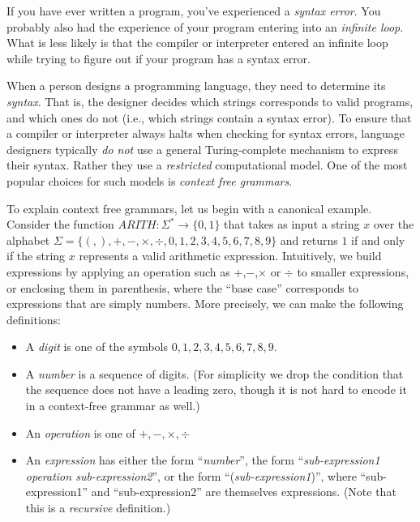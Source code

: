 If you have ever written a program, you've experienced a \emph{syntax
error}. You probably also had the experience of your program entering
into an \emph{infinite loop}. What is less likely is that the compiler
or interpreter entered an infinite loop while trying to figure out if
your program has a syntax error.

When a person designs a programming language, they need to determine its
\emph{syntax}. That is, the designer decides which strings corresponds
to valid programs, and which ones do not (i.e., which strings contain a
syntax error). To ensure that a compiler or interpreter always halts
when checking for syntax errors, language designers typically \emph{do
not} use a general Turing-complete mechanism to express their syntax.
Rather they use a \emph{restricted} computational model. One of the most
popular choices for such models is \emph{context free grammars}.

To explain context free grammars, let us begin with a canonical example.
Consider the function
\(\ensuremath{\mathit{ARITH}}:\Sigma^* \rightarrow \{0,1\}\) that takes
as input a string \(x\) over the alphabet
\(\Sigma = \{ (,),+,-,\times,\div,0,1,2,3,4,5,6,7,8,9\}\) and returns
\(1\) if and only if the string \(x\) represents a valid arithmetic
expression. Intuitively, we build expressions by applying an operation
such as \(+\),\(-\),\(\times\) or \(\div\) to smaller expressions, or
enclosing them in parenthesis, where the ``base case'' corresponds to
expressions that are simply numbers. More precisely, we can make the
following definitions:

\begin{itemize}
\item
  A \emph{digit} is one of the symbols \(0,1,2,3,4,5,6,7,8,9\).
\item
  A \emph{number} is a sequence of digits. (For simplicity we drop the
  condition that the sequence does not have a leading zero, though it is
  not hard to encode it in a context-free grammar as well.)
\item
  An \emph{operation} is one of \(+,-,\times,\div\)
\item
  An \emph{expression} has either the form ``\emph{number}'', the form
  ``\emph{sub-expression1 operation sub-expression2}'', or the form
  ``(\emph{sub-expression1})'', where ``sub-expression1'' and
  ``sub-expression2'' are themselves expressions. (Note that this is a
  \emph{recursive} definition.)
\end{itemize}


